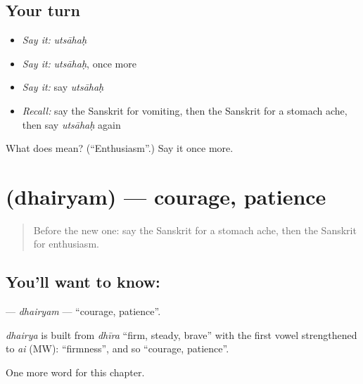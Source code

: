 \subsection*{Your turn}
\begin{itemize}
\raggedright
  \item \emph{Say it:} \emph{utsāhaḥ}
  \item \emph{Say it:} \emph{utsāhaḥ}, once more
  \item \emph{Say it:} say \emph{utsāhaḥ}
  \item \emph{Recall:} say the Sanskrit for vomiting, then the Sanskrit for a stomach ache, then say \emph{utsāhaḥ} again
\end{itemize}

\begin{tcolorbox}[breakable,colback=teal!4,colframe=teal!35!black,title={Before you move on}]
What does  mean? (\textquotedblleft{}Enthusiasm\textquotedblright{}.) Say it once more.
\end{tcolorbox}
\section[\texorpdfstring{\sk{धैर्यम्} (dhairyam)}{धैर्यम् (dhairyam)}]{ (dhairyam) — courage, patience}

\label{lesson:SA-C151-dhairyam}



\begin{quote}
Before the new one: say the Sanskrit for a stomach ache, then the Sanskrit for enthusiasm.
\end{quote}

\subsection*{You'll want to know: }
\textbf{} — \emph{dhairyam} — \textquotedblleft{}courage, patience\textquotedblright{}.

\begin{cousinweb}
\emph{dhairya} is built from \emph{dhīra} \textquotedblleft{}firm, steady, brave\textquotedblright{} with the first vowel strengthened to \emph{ai} (MW): \textquotedblleft{}firmness\textquotedblright{}, and so \textquotedblleft{}courage, patience\textquotedblright{}.
\end{cousinweb}

\begin{grammarlens}[title={What you've built}]
One more word for this chapter.
\end{grammarlens}

